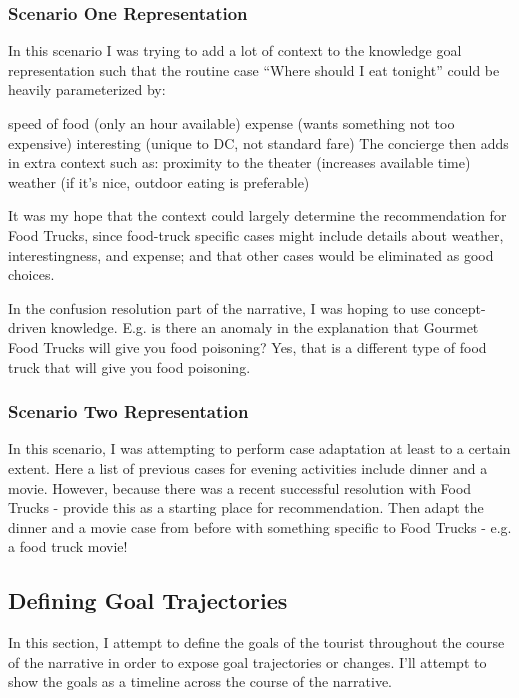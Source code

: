 \subsubsection{Scenario One Representation}

In this scenario I was trying to add a lot of context to the knowledge goal representation such that the routine case “Where should I eat tonight” could be heavily parameterized by:

speed of food (only an hour available)
expense (wants something not too expensive)
interesting (unique to DC, not standard fare)
The concierge then adds in extra context such as:
proximity to the theater (increases available time)
weather (if it’s nice, outdoor eating is preferable)

It was my hope that the context could largely determine the recommendation for Food Trucks, since food-truck specific cases might include details about weather, interestingness, and expense; and that other cases would be eliminated as good choices.

In the confusion resolution part of the narrative, I was hoping to use concept-driven knowledge. E.g. is there an anomaly in the explanation that Gourmet Food Trucks will give you food poisoning? Yes, that is a different type of food truck that will give you food poisoning.

\subsubsection{Scenario Two Representation}

In this scenario, I was attempting to perform case adaptation at least to a certain extent. Here a list of previous cases for evening activities include dinner and a movie. However, because there was a recent successful resolution with Food Trucks - provide this as a starting place for recommendation. Then adapt the dinner and a movie case from before with something specific to Food Trucks - e.g. a food truck movie!

\subsection{Defining Goal Trajectories}

In this section, I attempt to define the goals of the tourist throughout the course of the narrative in order to expose goal trajectories or changes. I’ll attempt to show the goals as a timeline across the course of the narrative.

